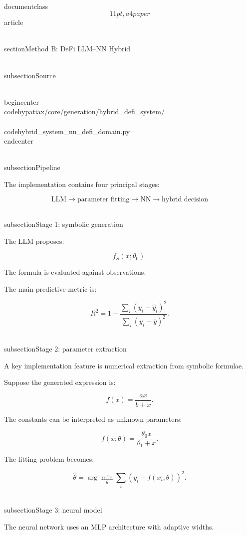 \\documentclass\[11pt,a4paper\]{article}
\begin{document}
 \\section{Method B: DeFi LLM--NN Hybrid}\

 \\subsection{Source}

 \\begin{center}\
 \\code{hypatiax/core/generation/hybrid\_defi\_system/}\\\
 \\code{hybrid\_system\_nn\_defi\_domain.py}\
 \\end{center}

 \\subsection{Pipeline}

 The implementation contains four principal stages:

 $$
\boxed{
\text{LLM}
\rightarrow
\text{parameter fitting}
\rightarrow
\text{NN}
\rightarrow
\text{hybrid decision}
}
$$

 \\subsection{Stage 1: symbolic generation}

 The LLM proposes:

 $$
f_S(x;\theta_0).
$$

 The formula is evaluated against observations.

 The main predictive metric is:

 $$
R^2
=
1-
\frac{\sum_i(y_i-\hat y_i)^2}
{\sum_i(y_i-\bar y)^2}.
$$

 \\subsection{Stage 2: parameter extraction}

 A key implementation feature is numerical extraction from symbolic formulae.

 Suppose the generated expression is:

 $$
f(x)=\frac{a x}{b+x}.
$$

 The constants can be interpreted as unknown parameters:

 $$
f(x;\theta)
=
\frac{\theta_0x}{\theta_1+x}.
$$

 The fitting problem becomes:

 $$
\hat{\theta}
=
\arg\min_\theta
\sum_i
\left(
y_i-f(x_i;\theta)
\right)^2.
$$

 \\subsection{Stage 3: neural model}

 The neural network uses an MLP architecture with adaptive widths.
\end{document}
